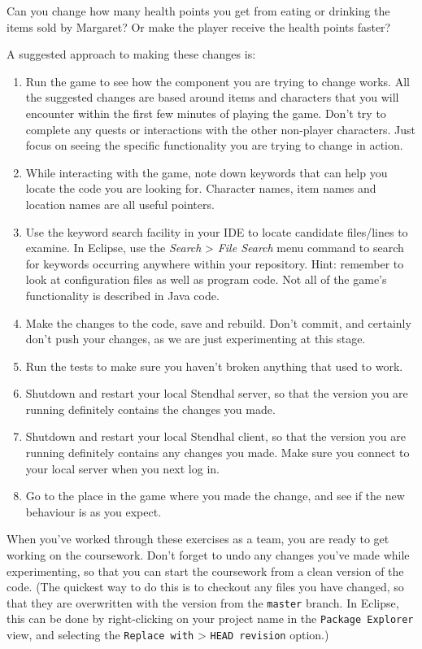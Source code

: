 \documentclass[
]{book}
\providecommand{\tightlist}{%
  \setlength{\itemsep}{0pt}\setlength{\parskip}{0pt}}
\begin{document}
Can you change how many health points you get from eating or drinking the items sold by Margaret? Or make the player receive the health points faster?

A suggested approach to making these changes is:

\begin{enumerate}
\def\labelenumi{\arabic{enumi}.}
\tightlist
\item
  Run the game to see how the component you are trying to change works. All the suggested changes are based around items and characters that you will encounter within the first few minutes of playing the game. Don't try to complete any quests or interactions with the other non-player characters. Just focus on seeing the specific functionality you are trying to change in action.
\item
  While interacting with the game, note down keywords that can help you locate the code you are looking for. Character names, item names and location names are all useful pointers.
\item
  Use the keyword search facility in your IDE to locate candidate files/lines to examine. In Eclipse, use the \emph{Search} \textgreater{} \emph{File Search} menu command to search for keywords occurring anywhere within your repository. Hint: remember to look at configuration files as well as program code. Not all of the game's functionality is described in Java code.
\item
  Make the changes to the code, save and rebuild. Don't commit, and certainly don't push your changes, as we are just experimenting at this stage.
\item
  Run the tests to make sure you haven't broken anything that used to work.
\item
  Shutdown and restart your local Stendhal server, so that the version you are running definitely contains the changes you made.
\item
  Shutdown and restart your local Stendhal client, so that the version you are running definitely contains any changes you made. Make sure you connect to your local server when you next log in.
\item
  Go to the place in the game where you made the change, and see if the new behaviour is as you expect.
\end{enumerate}

When you've worked through these exercises as a team, you are ready to get working on the coursework. Don't forget to undo any changes you've made while experimenting, so that you can start the coursework from a clean version of the code. (The quickest way to do this is to checkout any files you have changed, so that they are overwritten with the version from the \texttt{master} branch. In Eclipse, this can be done by right-clicking on your project name in the \texttt{Package\ Explorer} view, and selecting the \texttt{Replace\ with} \textgreater{} \texttt{HEAD\ revision} option.)
\end{document}
